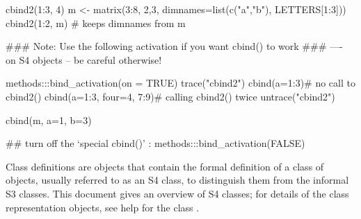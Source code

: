 \begin{Examples}
\begin{ExampleCode}
cbind2(1:3, 4)
m <- matrix(3:8, 2,3, dimnames=list(c("a","b"), LETTERS[1:3]))
cbind2(1:2, m) # keeps dimnames from m

### Note: Use the following activation if you want cbind() to work
### ----  on S4 objects -- be careful otherwise!

methods:::bind_activation(on = TRUE)
trace("cbind2")
cbind(a=1:3)# no call to cbind2()
cbind(a=1:3, four=4, 7:9)# calling cbind2() twice
untrace("cbind2")



cbind(m, a=1, b=3)

## turn off the `special cbind()' :
methods:::bind_activation(FALSE)
\end{ExampleCode}
\end{Examples}
%
\begin{Description}\relax
Class definitions are objects that contain the formal definition of a
class of \R{} objects, usually referred to as an S4 class, to
distinguish them from the informal S3 classes.
This document gives an overview of S4 classes; for
details of the class representation objects, see help for the class
.
\end{Description}
%
